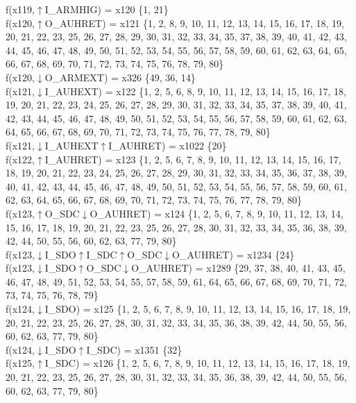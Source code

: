f(x119,$\uparrow$I\_ARMHIG) = x120 \{1, 21\} \\  
f(x120,$\uparrow$O\_AUHRET) = x121 \{1, 2, 8, 9, 10, 11, 12, 13, 14, 15, 16, 17, 18, 19, 20, 21, 22, 23, 25, 26, 27, 28, 29, 30, 31, 32, 33, 34, 35, 37, 38, 39, 40, 41, 42, 43, 44, 45, 46, 47, 48, 49, 50, 51, 52, 53, 54, 55, 56, 57, 58, 59, 60, 61, 62, 63, 64, 65, 66, 67, 68, 69, 70, 71, 72, 73, 74, 75, 76, 78, 79, 80\} \\  
f(x120,$\downarrow$O\_ARMEXT) = x326 \{49, 36, 14\} \\  
f(x121,$\downarrow$I\_AUHEXT) = x122 \{1, 2, 5, 6, 8, 9, 10, 11, 12, 13, 14, 15, 16, 17, 18, 19, 20, 21, 22, 23, 24, 25, 26, 27, 28, 29, 30, 31, 32, 33, 34, 35, 37, 38, 39, 40, 41, 42, 43, 44, 45, 46, 47, 48, 49, 50, 51, 52, 53, 54, 55, 56, 57, 58, 59, 60, 61, 62, 63, 64, 65, 66, 67, 68, 69, 70, 71, 72, 73, 74, 75, 76, 77, 78, 79, 80\} \\  
f(x121,$\downarrow$I\_AUHEXT$\uparrow$I\_AUHRET) = x1022 \{20\} \\  
f(x122,$\uparrow$I\_AUHRET) = x123 \{1, 2, 5, 6, 7, 8, 9, 10, 11, 12, 13, 14, 15, 16, 17, 18, 19, 20, 21, 22, 23, 24, 25, 26, 27, 28, 29, 30, 31, 32, 33, 34, 35, 36, 37, 38, 39, 40, 41, 42, 43, 44, 45, 46, 47, 48, 49, 50, 51, 52, 53, 54, 55, 56, 57, 58, 59, 60, 61, 62, 63, 64, 65, 66, 67, 68, 69, 70, 71, 72, 73, 74, 75, 76, 77, 78, 79, 80\} \\  
f(x123,$\uparrow$O\_SDC$\downarrow$O\_AUHRET) = x124 \{1, 2, 5, 6, 7, 8, 9, 10, 11, 12, 13, 14, 15, 16, 17, 18, 19, 20, 21, 22, 23, 25, 26, 27, 28, 30, 31, 32, 33, 34, 35, 36, 38, 39, 42, 44, 50, 55, 56, 60, 62, 63, 77, 79, 80\} \\  
f(x123,$\downarrow$I\_SDO$\uparrow$I\_SDC$\uparrow$O\_SDC$\downarrow$O\_AUHRET) = x1234 \{24\} \\  
f(x123,$\downarrow$I\_SDO$\uparrow$O\_SDC$\downarrow$O\_AUHRET) = x1289 \{29, 37, 38, 40, 41, 43, 45, 46, 47, 48, 49, 51, 52, 53, 54, 55, 57, 58, 59, 61, 64, 65, 66, 67, 68, 69, 70, 71, 72, 73, 74, 75, 76, 78, 79\} \\  
f(x124,$\downarrow$I\_SDO) = x125 \{1, 2, 5, 6, 7, 8, 9, 10, 11, 12, 13, 14, 15, 16, 17, 18, 19, 20, 21, 22, 23, 25, 26, 27, 28, 30, 31, 32, 33, 34, 35, 36, 38, 39, 42, 44, 50, 55, 56, 60, 62, 63, 77, 79, 80\} \\  
f(x124,$\downarrow$I\_SDO$\uparrow$I\_SDC) = x1351 \{32\} \\  
f(x125,$\uparrow$I\_SDC) = x126 \{1, 2, 5, 6, 7, 8, 9, 10, 11, 12, 13, 14, 15, 16, 17, 18, 19, 20, 21, 22, 23, 25, 26, 27, 28, 30, 31, 32, 33, 34, 35, 36, 38, 39, 42, 44, 50, 55, 56, 60, 62, 63, 77, 79, 80\} \\  
